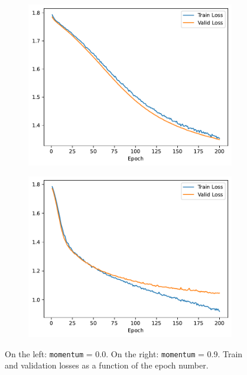 \documentclass[a4paper, 12pt]{article}
\begin{document}
\begin{figure}[H]
    \centering
     \begin{subfigure}{0.47\textwidth}
        \includegraphics[width=\textwidth]{plot/mlp-training-loss-batch-1024-lr-0.002-epochs-200-hidden-200-dropout-0.3-l2-0.0-layers-2-act-relu-opt-sgd-mom-0.0.pdf}
        \label{fig:3_}
    \end{subfigure}
    \hfill
    \begin{subfigure}{0.47
    \textwidth}
        \includegraphics[width=\textwidth]{plot/mlp-training-loss-batch-1024-lr-0.002-epochs-200-hidden-200-dropout-0.3-l2-0.0-layers-2-act-relu-opt-sgd-mom-0.9.pdf}
        \label{fig:3_eg}
    \end{subfigure}
    \vspace{-0.6cm}
    \caption{On the left: \texttt{momentum} = 0.0. On the right: \texttt{momentum} = 0.9. Train and validation losses as a function of the epoch number.}
    \label{fig:qa}
\end{figure}
\end{document}
